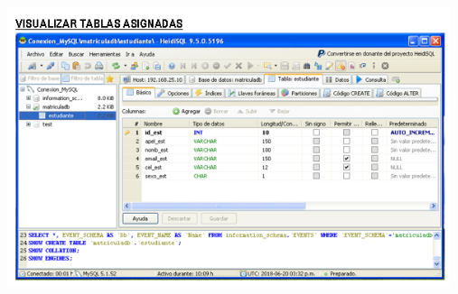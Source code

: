 \begin{itemize}
	\begin{center}
		\includegraphics[width=13cm]{./Imagenes/23a}
		\end{center}
\end{itemize} 
